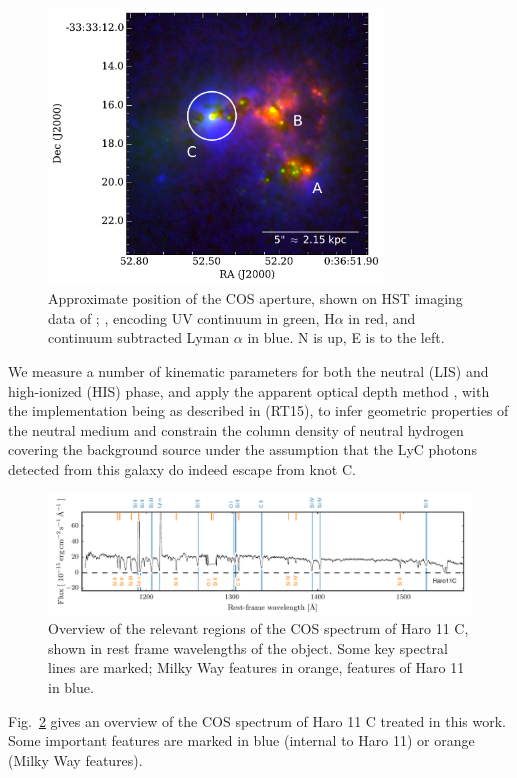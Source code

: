 \documentclass[twocolumn]{aastex61}
\begin{document}
\begin{figure}
\centering
\includegraphics[width=3.500in]{./Haroslit.pdf}
\caption{Approximate position of the COS aperture, shown on HST imaging
data of \citet{Hayes2009}; \citet{Ostlin2009}, encoding UV continuum in
green, H$\alpha$ in red, and continuum subtracted Lyman $\alpha$ in
blue. N is up, E is to the left.}\label{fig:apert}
\end{figure}

We measure a number of kinematic parameters for both the neutral (LIS)
and high-ionized (HIS) phase, and apply the apparent optical depth
method \citep{Savage1991, Pettini2002, Quider2009, Jones2013}, with the
implementation being as described in \citet{RiveraThorsen2015} (RT15),
to infer geometric properties of the neutral medium and constrain the
column density of neutral hydrogen covering the background source under
the assumption that the LyC photons detected from this galaxy do indeed
escape from knot C.

\begin{figure}
\centering
\includegraphics[]{./FullSpec.pdf}
\caption{Overview of the relevant regions of the COS spectrum of Haro 11
C, shown in rest frame wavelengths of the object. Some key spectral
lines are marked; Milky Way features in orange, features of Haro 11 in
blue.}\label{fig:fullspec}
\end{figure}

Fig.~\ref{fig:fullspec} gives an overview of the COS spectrum of Haro 11
C treated in this work. Some important features are marked in blue
(internal to Haro 11) or orange (Milky Way features).
\end{document}
